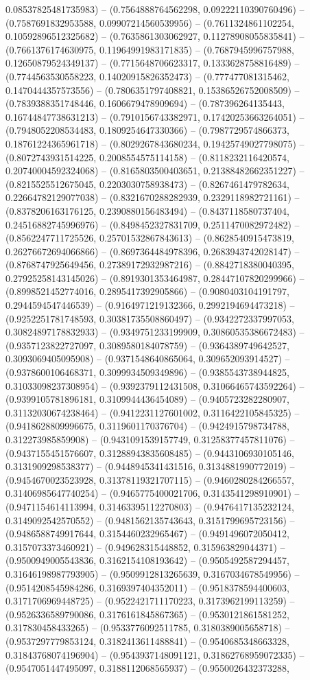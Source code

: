 0.08537825481735983) -- (0.7564888764562298, 0.09222110390760496) -- (0.7587691832953588, 0.09907214560539956) -- (0.7611324861102254, 0.10592896512325682) -- (0.7635861303062927, 0.11278908055835841) -- (0.7661376174630975, 0.11964991983171835) -- (0.7687945996757988, 0.12650879524349137) -- (0.7715648706623317, 0.1333628758816489) -- (0.7744563530558223, 0.14020915826352473) -- (0.777477081315462, 0.1470444357573556) -- (0.7806351797408821, 0.15386526752008509) -- (0.7839388351748446, 0.1606679478909694) -- (0.787396264135443, 0.16744847738631213) -- (0.7910156743382971, 0.17420253663264051) -- (0.7948052208534483, 0.1809254647330366) -- (0.7987729574866373, 0.18761224365961718) -- (0.8029267843680234, 0.19425749027798075) -- (0.8072743931514225, 0.2008554575114158) -- (0.8118232116420574, 0.20740004592324068) -- (0.8165803500403651, 0.21388482662351227) -- (0.8215525512675045, 0.2203030758938473) -- (0.8267461479782634, 0.22664782129077038) -- (0.8321670288282939, 0.2329118982721161) -- (0.8378206163176125, 0.2390880156483494) -- (0.8437118580737404, 0.24516882745996976) -- (0.8498452327831709, 0.2511470082972482) -- (0.8562247711725526, 0.25701532867843613) -- (0.8628540915473819, 0.26276672694066866) -- (0.8697364484978396, 0.2683943742028147) -- (0.8768747925649456, 0.27389172932987216) -- (0.8842718380040395, 0.27925258143145026) -- (0.8919301353464987, 0.28447107820299966) -- (0.8998521452774016, 0.2895417392905866) -- (0.9080403104191797, 0.2944594547446539) -- (0.9164971219132366, 0.2992194694473218) -- (0.9252251781748593, 0.30381735508860497) -- (0.9342272337997053, 0.30824897178832933) -- (0.9349751233199909, 0.30860535386672483) -- (0.9357123822727097, 0.3089580184078759) -- (0.9364389749642527, 0.3093069405095908) -- (0.9371548640865064, 0.309652093914527) -- (0.9378600106468371, 0.3099934509349896) -- (0.9385543738944825, 0.31033098237308954) -- (0.9392379112431508, 0.31066465743592264) -- (0.9399105781896181, 0.3109944436454089) -- (0.9405723282280907, 0.31132030674238464) -- (0.9412231127601002, 0.3116422105845325) -- (0.9418628809996675, 0.3119601170376704) -- (0.9424915798734788, 0.312273985859908) -- (0.9431091539157749, 0.31258377457811076) -- (0.9437155451576607, 0.31288943835608485) -- (0.9443106930105146, 0.3131909298538377) -- (0.9448945341431516, 0.3134881990772019) -- (0.9454670023523928, 0.31378119321707115) -- (0.9460280284266557, 0.31406985647740254) -- (0.9465775400021706, 0.3143541298910901) -- (0.9471154614113994, 0.31463395112270803) -- (0.9476417135232124, 0.3149092542570552) -- (0.9481562135743643, 0.3151799695723156) -- (0.9486588749917644, 0.3154460232965467) -- (0.9491496072050412, 0.3157073373460921) -- (0.949628315448852, 0.315963829044371) -- (0.9500949005543836, 0.3162154108193642) -- (0.9505492587294457, 0.31646198987793905) -- (0.9509912813265639, 0.3167034678549956) -- (0.9514208545984286, 0.3169397404352011) -- (0.9518378594400603, 0.3171706969448725) -- (0.9522421711170223, 0.3173962199113259) -- (0.9526336589790086, 0.3176161845867365) -- (0.9530121861581252, 0.317830458433265) -- (0.9533776092511785, 0.3180389005658718) -- (0.9537297779853124, 0.3182413611488841) -- (0.9540685348663328, 0.31843768074196904) -- (0.9543937148091121, 0.31862768959072335) -- (0.9547051447495097, 0.3188112068565937) -- (0.9550026432373288, 